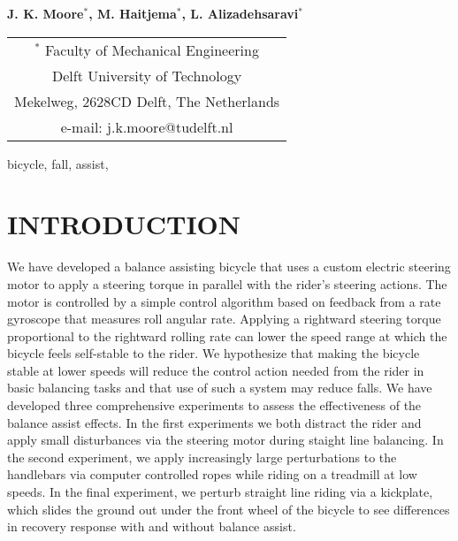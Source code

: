 \documentclass{icsc}
\begin{document}
\begin{center}
\end{center}

\begin{center}
  \normalsize{\bf{J. K. Moore$^{*}$,
                  M. Haitjema$^{*}$,
                  L. Alizadehsaravi$^{*}$}}
\end{center}

\begin{center}
  \begin{tabular}{c}
    $^*$ Faculty of Mechanical Engineering\\
    Delft University of Technology\\
    Mekelweg, 2628CD Delft, The Netherlands\\
    e-mail: j.k.moore@tudelft.nl\\
  \end{tabular}
\end{center}

\begin{keywords}
  bicycle,
  fall,
  assist,
\end{keywords}

\section{INTRODUCTION}
%
We have developed a balance assisting bicycle that uses a custom electric
steering motor to apply a steering torque in parallel with the rider's steering
actions. The motor is controlled by a simple control algorithm based on
feedback from a rate gyroscope that measures roll angular rate. Applying a
rightward steering torque proportional to the rightward rolling rate  can lower
the speed range at which the bicycle feels self-stable to the rider. We
hypothesize that making the bicycle stable at lower speeds will reduce the
control action needed from the rider in basic balancing tasks and that use of
such a system may reduce falls. We have developed three comprehensive
experiments to assess the effectiveness of the balance assist effects. In the
first experiments we both distract the rider and apply small disturbances via
the steering motor during staight line balancing. In the second experiment, we
apply increasingly large perturbations to the handlebars via computer
controlled ropes while riding on a treadmill at low speeds. In the final
experiment, we perturb straight line riding via a kickplate, which slides the
ground out under the front wheel of the bicycle to see differences in recovery
response with and without balance assist.
\end{document}
